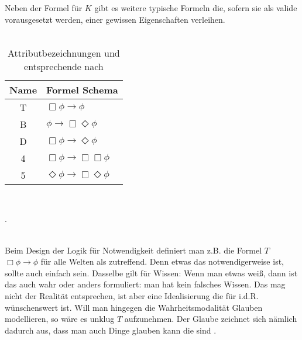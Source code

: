 Neben der Formel für $K$ gibt es weitere typische Formeln die, sofern sie als valide vorausgesetzt werden, einer \ML gewissen Eigenschaften verleihen.\\
\\
\begin{table}
	\label{tab:attributes}
	\centering
	\begin{tabular}{cl}
	\hline
	\hline
	Name & Formel Schema\\
	\hline
	T & $\Box \phi \rightarrow \phi$\\
	B & $\phi \rightarrow \Box \Diamond\phi$\\
	D & $\Box \phi \rightarrow \Diamond \phi$\\
	4 & $\Box \phi \rightarrow \Box \Box \phi$\\
	5 & $\Diamond \phi \rightarrow \Box \Diamond \phi$\\
	\hline
	\end{tabular}\\
	\caption{Attributbezeichnungen und entsprechende \formelSchemata
	nach }.
\end{table}
\\
Beim Design der Logik für Notwendigkeit definiert man z.B. die Formel $T$ $\Box \phi \rightarrow \phi$ für alle Welten als zutreffend.
Denn etwas das notwendigerweise \true ist, sollte auch einfach \true sein.
Dasselbe gilt für Wissen: Wenn man etwas weiß, dann ist das auch wahr oder anders formuliert: man hat kein falsches Wissen.
Das mag nicht der Realität entsprechen, ist aber eine Idealisierung die für \MAS i.d.R. wünschenswert ist.
Will man hingegen die Wahrheitsmodalität Glauben modellieren, so wäre es unklug $T$ aufzunehmen.
Der Glaube zeichnet sich nämlich dadurch aus, dass man auch Dinge glauben kann die \false sind .

